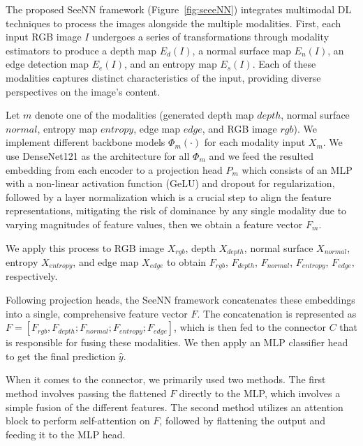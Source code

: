 The proposed SeeNN framework (Figure~\ref{fig:seeeNN}) integrates multimodal DL techniques to process the images alongside the multiple modalities. 
First, each input RGB image \( I \) undergoes a series of transformations through modality estimators to produce a depth map \( E_d(I) \), a normal surface map \( E_n(I) \), an edge detection map \( E_e(I) \), and an entropy map \( E_s(I) \). Each of these modalities captures distinct characteristics of the input, providing diverse perspectives on the image's content.

Let $m$ denote one of the modalities (generated depth map $depth$, normal surface $normal$, entropy map $entropy$, edge map $edge$, and RGB image $rgb$). We implement different backbone models $\Phi_{m}(\cdot)$ for each modality input $X_m$. 
We use DenseNet121 \cite{huang_densely_2018} as the architecture for all $\Phi_{m}$ and we feed the resulted embedding from each encoder to a projection head $P_m$ which consists of an MLP with a non-linear
activation function (GeLU) and dropout for regularization, followed by a layer normalization which is a crucial step to align the feature representations, mitigating the risk of dominance by any single modality due to varying magnitudes of feature values, then we obtain a feature vector \( F_m \).

We apply this process to RGB image $X_{rgb}$, depth \( X_{depth} \), normal surface  \( X_{normal} \), entropy  \( X_{entropy} \), and edge map \( X_{edge} \) to obtain $F_{rgb}$, $F_{depth}$, $F_{normal}$, $F_{entropy}$, $F_{edge}$, respectively. 

Following projection heads, the SeeNN framework concatenates these embeddings into a single, comprehensive feature vector \( F \). 
The concatenation is represented as \( F = [F_{rgb}, F_{depth}; F_{normal}; F_{entropy}; F_{edge}] \), which is then fed to the connector $C$ that is responsible for fusing these modalities.
We then apply an MLP classifier head to get the final prediction $\hat{y}$.  

When it comes to the connector, we primarily used two methods. The first method involves passing the flattened $F$ directly to the MLP, which involves a simple fusion of the different features. The second method utilizes an attention block to perform self-attention on $F$, followed by flattening the output and feeding it to the MLP head.


